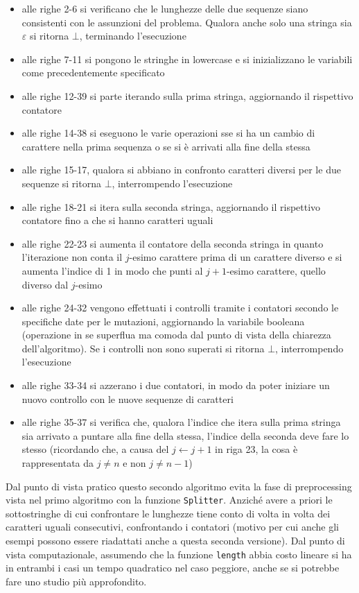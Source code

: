 \documentclass[a4paper,12pt, oneside]{book}
\begin{document}
\begin{itemize}
  \item alle righe 2-6 si verificano che le lunghezze delle due sequenze siano
  consistenti con le assunzioni del problema. Qualora anche solo una stringa sia
  $\varepsilon$ si ritorna $\bot$, terminando l'esecuzione
  \item alle righe 7-11 si pongono le stringhe in lowercase e si inizializzano
  le variabili come precedentemente specificato
  \item alle righe 12-39 si parte iterando sulla prima stringa, aggiornando il
  rispettivo contatore
  \item alle righe 14-38 si eseguono le varie operazioni sse si
  ha un cambio di carattere nella prima sequenza o se si è arrivati alla fine
  della stessa
  \item alle righe 15-17, qualora si abbiano in confronto caratteri diversi per
  le due sequenze si ritorna $\bot$, interrompendo l'esecuzione
  \item alle righe 18-21 si itera sulla seconda stringa, aggiornando il
  rispettivo contatore fino a che si hanno caratteri uguali
  \item alle righe 22-23 si aumenta il contatore della seconda stringa in quanto
  l'iterazione non conta il $j$-esimo carattere prima di un carattere diverso e
  si aumenta l'indice di 1 in modo che punti al $j+1$-esimo carattere, quello
  diverso dal $j$-esimo 
  \item alle righe 24-32 vengono effettuati i controlli tramite i contatori
  secondo le specifiche date per le mutazioni, aggiornando la variabile
  booleana (operazione in se superflua ma comoda dal punto di vista della
  chiarezza dell'algoritmo). Se i controlli non sono superati si ritorna $\bot$,
  interrompendo l'esecuzione 
  \item alle righe 33-34 si azzerano i due contatori, in modo da poter iniziare
  un nuovo controllo con le nuove sequenze di caratteri
  \item alle righe 35-37 si verifica che, qualora l'indice che itera sulla prima
  stringa sia arrivato a puntare alla fine della stessa, l'indice della seconda
  deve fare lo stesso (ricordando che, a causa del $j\gets j+1$ in riga 23, la
  cosa è rappresentata da $j\neq n$ e non $j\neq n-1$)
\end{itemize}
Dal punto di vista pratico questo secondo algoritmo evita la fase di
preprocessing vista nel primo algoritmo con la funzione
\texttt{Splitter}. Anziché avere a priori le sottostringhe di cui confrontare le
lunghezze tiene conto di volta in volta dei caratteri uguali consecutivi,
confrontando i contatori (motivo per cui anche gli esempi possono essere
riadattati anche a questa seconda versione). Dal
punto di vista computazionale, assumendo che la funzione \texttt{length} abbia
costo lineare si ha in entrambi i casi un tempo quadratico nel caso peggiore,
anche se si potrebbe fare uno studio più approfondito. 
\end{document}
